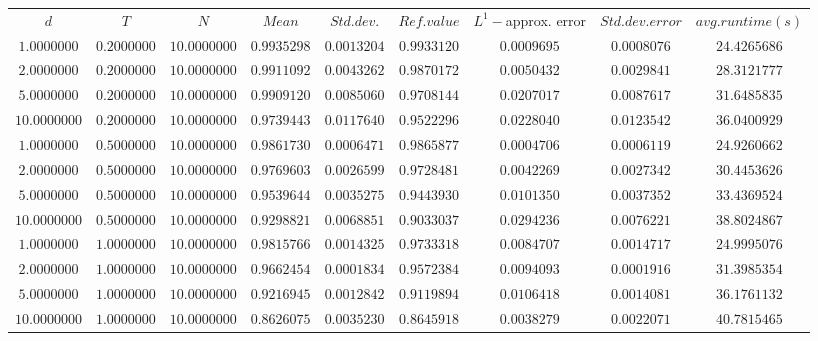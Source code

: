 \begin{tabular}{ccccccccc}
$d$ & $T$ & $N$ & $Mean$ & $Std. dev.$ & $Ref. value$ & $L^1-$approx. error & $Std. dev. error$ & $avg. runtime (s)$\\
$1.0000000$ & $0.2000000$ & $10.0000000$ & $0.9935298$ & $0.0013204$ & $0.9933120$ & $0.0009695$ & $0.0008076$ & $24.4265686$\\
$2.0000000$ & $0.2000000$ & $10.0000000$ & $0.9911092$ & $0.0043262$ & $0.9870172$ & $0.0050432$ & $0.0029841$ & $28.3121777$\\
$5.0000000$ & $0.2000000$ & $10.0000000$ & $0.9909120$ & $0.0085060$ & $0.9708144$ & $0.0207017$ & $0.0087617$ & $31.6485835$\\
$10.0000000$ & $0.2000000$ & $10.0000000$ & $0.9739443$ & $0.0117640$ & $0.9522296$ & $0.0228040$ & $0.0123542$ & $36.0400929$\\
$1.0000000$ & $0.5000000$ & $10.0000000$ & $0.9861730$ & $0.0006471$ & $0.9865877$ & $0.0004706$ & $0.0006119$ & $24.9260662$\\
$2.0000000$ & $0.5000000$ & $10.0000000$ & $0.9769603$ & $0.0026599$ & $0.9728481$ & $0.0042269$ & $0.0027342$ & $30.4453626$\\
$5.0000000$ & $0.5000000$ & $10.0000000$ & $0.9539644$ & $0.0035275$ & $0.9443930$ & $0.0101350$ & $0.0037352$ & $33.4369524$\\
$10.0000000$ & $0.5000000$ & $10.0000000$ & $0.9298821$ & $0.0068851$ & $0.9033037$ & $0.0294236$ & $0.0076221$ & $38.8024867$\\
$1.0000000$ & $1.0000000$ & $10.0000000$ & $0.9815766$ & $0.0014325$ & $0.9733318$ & $0.0084707$ & $0.0014717$ & $24.9995076$\\
$2.0000000$ & $1.0000000$ & $10.0000000$ & $0.9662454$ & $0.0001834$ & $0.9572384$ & $0.0094093$ & $0.0001916$ & $31.3985354$\\
$5.0000000$ & $1.0000000$ & $10.0000000$ & $0.9216945$ & $0.0012842$ & $0.9119894$ & $0.0106418$ & $0.0014081$ & $36.1761132$\\
$10.0000000$ & $1.0000000$ & $10.0000000$ & $0.8626075$ & $0.0035230$ & $0.8645918$ & $0.0038279$ & $0.0022071$ & $40.7815465$\\
\end{tabular}
